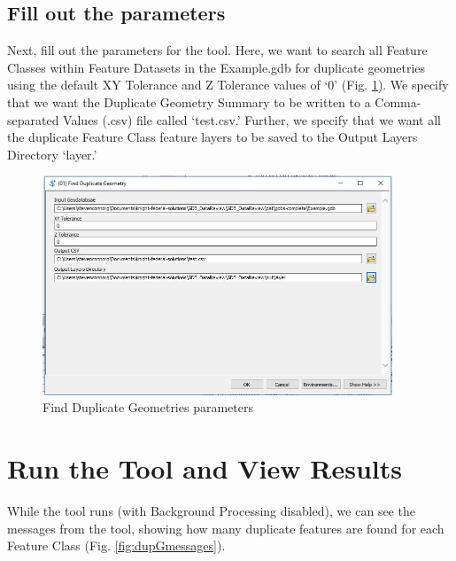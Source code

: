 \documentclass[openany]{book}
\theoremstyle{definition}
\theoremstyle{definition}
\theoremstyle{definition}
\theoremstyle{remark}
\begin{document}
\subsection{Fill out the parameters}\label{fill-out-the-parameters-4}

Next, fill out the parameters for the tool. Here, we want to search all
Feature Classes within Feature Datasets in the Example.gdb for duplicate
geometries using the default XY Tolerance and Z Tolerance values of `0'
(Fig. \ref{fig:dupGparams}). We specify that we want the Duplicate
Geometry Summary to be written to a Comma-separated Values (.csv) file
called `test.csv.' Further, we specify that we want all the duplicate
Feature Class feature layers to be saved to the Output Layers Directory
`layer.'

\begin{figure}[H]

{\centering \includegraphics[width=4.11in,]{figures/dupG-params} 

}

\caption{Find Duplicate Geometries parameters}\label{fig:dupGparams}
\end{figure}

\section{Run the Tool and View
Results}\label{run-the-tool-and-view-results-4}

While the tool runs (with Background Processing disabled), we can see
the messages from the tool, showing how many duplicate features are
found for each Feature Class (Fig. \ref{fig:dupGmessages}).
\end{document}
